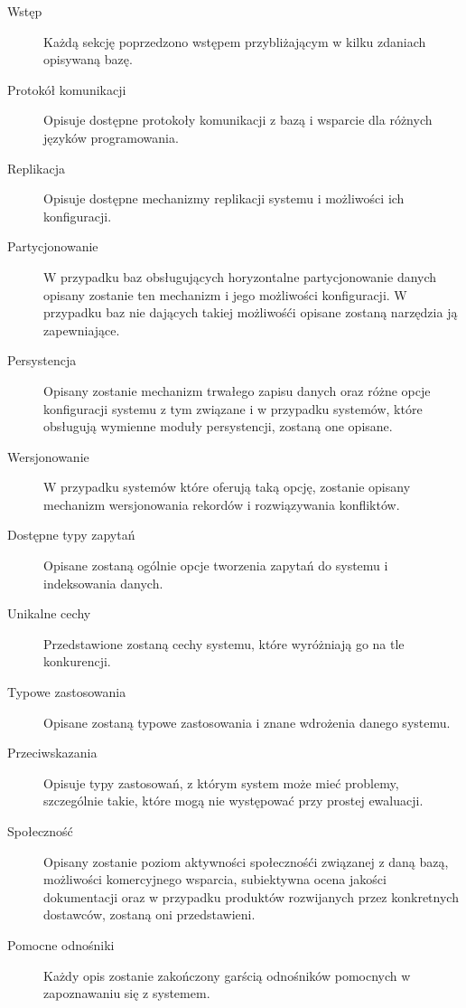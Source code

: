\begin{description}
 \item[Wstęp] 
 Każdą sekcję poprzedzono wstępem przybliżającym w kilku zdaniach opisywaną bazę. 
 
 \item[Protokół komunikacji]
 Opisuje dostępne protokoły komunikacji z bazą i wsparcie dla różnych języków programowania.

 \item[Replikacja]
 Opisuje dostępne mechanizmy replikacji systemu i możliwości ich konfiguracji.

 \item[Partycjonowanie]
 W przypadku baz obsługujących horyzontalne partycjonowanie danych opisany zostanie ten mechanizm i jego możliwości konfiguracji.
 W przypadku baz nie dających takiej możliwośći opisane zostaną narzędzia ją zapewniające.

 \item[Persystencja]
 Opisany zostanie mechanizm trwałego zapisu danych oraz różne opcje konfiguracji systemu z tym związane i w przypadku systemów, które obsługują wymienne moduły persystencji, zostaną one opisane.

 \item[Wersjonowanie]
 W przypadku systemów które oferują taką opcję, zostanie opisany mechanizm wersjonowania rekordów i rozwiązywania konfliktów.

 \item[Dostępne typy zapytań]
 Opisane zostaną ogólnie opcje tworzenia zapytań do systemu i indeksowania danych.

 \item[Unikalne cechy]
 Przedstawione zostaną cechy systemu, które wyróżniają go na tle konkurencji.

 \item[Typowe zastosowania]
 Opisane zostaną typowe zastosowania i znane wdrożenia danego systemu.

 \item[Przeciwskazania]
 Opisuje typy zastosowań, z którym system może mieć problemy, szczególnie takie, które mogą nie występować przy prostej ewaluacji.

 \item[Społeczność]
 Opisany zostanie poziom aktywności społecznośći związanej z daną bazą, możliwości komercyjnego wsparcia, subiektywna ocena jakości dokumentacji oraz w przypadku produktów rozwijanych przez konkretnych dostawców, zostaną oni przedstawieni.

 \item[Pomocne odnośniki]
 Każdy opis zostanie zakończony garścią odnośników pomocnych w zapoznawaniu się z systemem.

\end{description} 


